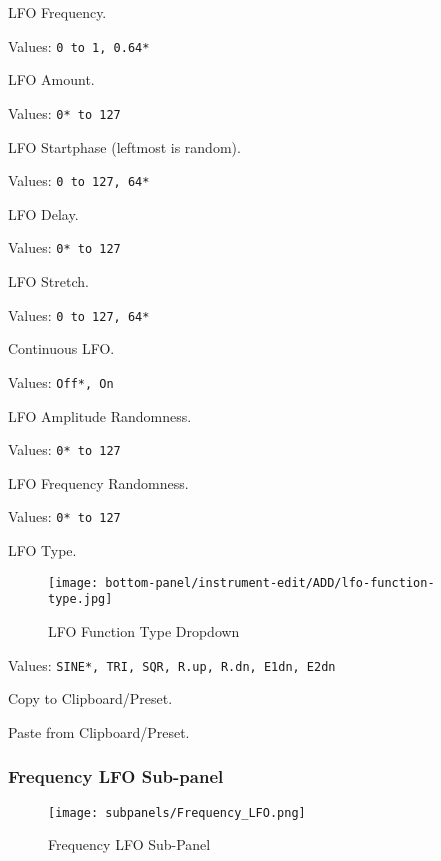    LFO Frequency.

   Values: \texttt{0 to 1, 0.64*}

   LFO Amount.

   Values: \texttt{0* to 127}

   LFO Startphase (leftmost is random).

   Values: \texttt{0 to 127, 64*}

   LFO Delay.

   Values: \texttt{0* to 127}

   LFO Stretch.

   Values: \texttt{0 to 127, 64*}

   Continuous LFO.

   Values: \texttt{Off*, On}

   LFO Amplitude Randomness.

   Values: \texttt{0* to 127}

   LFO Frequency Randomness.

   Values: \texttt{0* to 127}

   LFO Type.

\begin{figure}[H]
   \centering
   \texttt{[image: bottom-panel/instrument-edit/ADD/lfo-function-type.jpg]}
   \caption[LFO Function Types]{LFO Function Type Dropdown}
   \label{fig:frequency_lfo_dropdown}
\end{figure}

   Values: \texttt{SINE*, TRI, SQR, R.up, R.dn, E1dn, E2dn}

   Copy to Clipboard/Preset.

   Paste from Clipboard/Preset.

\subsubsection{Frequency LFO Sub-panel}
\label{subsubsec:frequency_lfo_sub_panel}

\begin{figure}[H]
   \centering
   \texttt{[image: subpanels/Frequency\_LFO.png]}
   \caption[Frequency LFO Sub-Panel]{Frequency LFO Sub-Panel}
   \label{fig:frequency_lfo_subpanel}
\end{figure}

